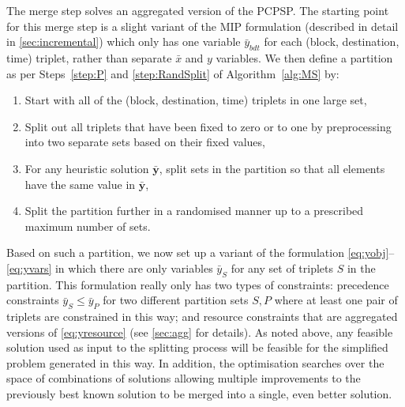 \documentclass[authoryear,11pt,square,number,times,super,comma]{elsarticle}
\newcommand\redsout{\bgroup\markoverwith{\textcolor{red}{\rule[0.5ex]{2pt}{0.4pt}}}\ULon}
\begin{document}
The merge step solves an aggregated version of the PCPSP.  The starting point 
for this merge step is a slight variant of the MIP formulation (described in detail in 
\ref{sec:incremental}) which only has one variable $\bar y_{bdt}$ for each (block, 
destination, time) triplet, rather than separate $\bar x$ and $y$ variables. We then 
define a partition as per Steps~\ref{step:P} and \ref{step:RandSplit} of 
Algorithm~\ref{alg:MS} by:
%
\begin{enumerate}
\item Start with all of the (block, destination, time) triplets in one large set,
\item Split out all triplets that have been fixed to zero or to one by preprocessing  into two separate sets based on their fixed values,
\item For any heuristic solution $\bar{\bm y}$, split sets in the partition so that all elements have the same value in $\bar{\bm y}$,
\item Split the partition further in a randomised manner up to a prescribed maximum number of sets.
\end{enumerate}
Based on such a partition, we now set up a variant of the formulation \eqref{eq:yobj}--\eqref{eq:yvars}
in which there are only variables $\bar y_S$ for any 
set of triplets $S$ in the partition. This formulation really only has two types of constraints: precedence constraints $\bar y_S \le \bar y_P$ for two different 
partition sets $S,P$ where at least one pair of triplets are constrained in this way; and resource constraints that are aggregated versions 
of \eqref{eq:yresource} (see \ref{sec:agg} for details).
As noted above, any feasible solution used as input to the splitting process will be feasible for the simplified problem 
generated in this way. In addition, the optimisation searches over the space of combinations of solutions allowing multiple improvements to the previously 
best known solution to be merged into a single, even better solution.
\end{document}
